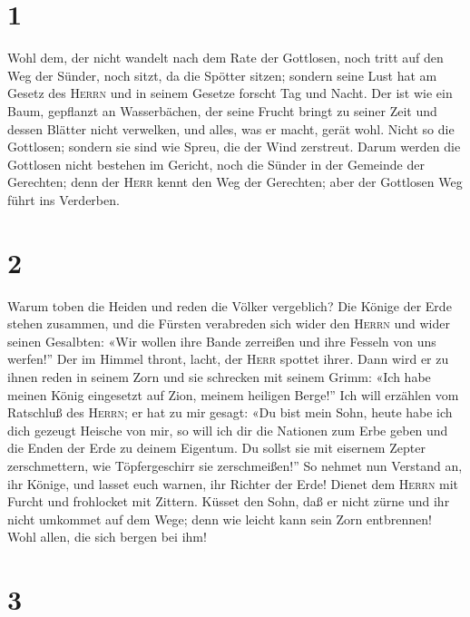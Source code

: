\hypertarget{section}{%
\section{1}\label{section}}

 Wohl dem, der nicht wandelt nach dem Rate der Gottlosen,
noch tritt auf den Weg der Sünder, noch sitzt, da die Spötter sitzen;
 sondern seine Lust hat am Gesetz des \textsc{Herrn} und
in seinem Gesetze forscht Tag und Nacht.  Der ist wie ein
Baum, gepflanzt an Wasserbächen, der seine Frucht bringt zu seiner Zeit
und dessen Blätter nicht verwelken, und alles, was er macht, gerät wohl.
 Nicht so die Gottlosen; sondern sie sind wie Spreu, die
der Wind zerstreut.  Darum werden die Gottlosen nicht
bestehen im Gericht, noch die Sünder in der Gemeinde der Gerechten;
 denn der \textsc{Herr} kennt den Weg der Gerechten; aber
der Gottlosen Weg führt ins Verderben.

\hypertarget{section-1}{%
\section{2}\label{section-1}}

 Warum toben die Heiden und reden die Völker vergeblich?
 Die Könige der Erde stehen zusammen, und die Fürsten
verabreden sich wider den \textsc{Herrn} und wider seinen Gesalbten:
 «Wir wollen ihre Bande zerreißen und ihre Fesseln von uns
werfen!''  Der im Himmel thront, lacht, der \textsc{Herr}
spottet ihrer.  Dann wird er zu ihnen reden in seinem Zorn
und sie schrecken mit seinem Grimm:  «Ich habe meinen
König eingesetzt auf Zion, meinem heiligen Berge!''  Ich
will erzählen vom Ratschluß des \textsc{Herrn}; er hat zu mir gesagt:
«Du bist mein Sohn, heute habe ich dich gezeugt  Heische
von mir, so will ich dir die Nationen zum Erbe geben und die Enden der
Erde zu deinem Eigentum.  Du sollst sie mit eisernem
Zepter zerschmettern, wie Töpfergeschirr sie zerschmeißen!''
 So nehmet nun Verstand an, ihr Könige, und lasset euch
warnen, ihr Richter der Erde!  Dienet dem \textsc{Herrn}
mit Furcht und frohlocket mit Zittern.  Küsset den Sohn,
daß er nicht zürne und ihr nicht umkommet auf dem Wege; denn wie leicht
kann sein Zorn entbrennen! Wohl allen, die sich bergen bei ihm!

\hypertarget{section-2}{%
\section{3}\label{section-2}}

